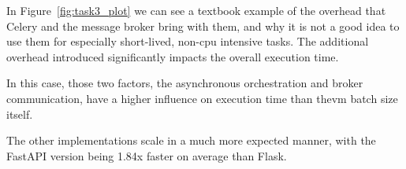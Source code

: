             In Figure~\ref{fig:task3_plot} we can see a textbook example of the overhead that Celery and the message broker 
            bring with them, and why it is not a good idea to use them for especially short-lived, non-\ac{cpu} intensive tasks. 
            The additional overhead introduced significantly impacts the overall execution time. 

            In this case, those two factors, the asynchronous orchestration and broker communication, have a higher influence on 
            execution time than the\ac{vm} batch size itself.

            The other implementations scale in a much more expected manner, with the FastAPI version being 1.84x faster on average 
            than Flask.

            \begin{figure}[ht]
                \centering
\end{figure}
